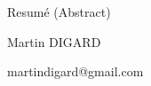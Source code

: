 
	
	\Large
	\begin{center}
		Resumé (Abstract)\\ 
		
		\hspace{10pt}
		
		\large
		Martin DIGARD\\
		
		\hspace{10pt}
		
		\small
		martindigard@gmail.com\\
		
	\end{center}
	
	\hspace{10pt}
	
	\normalsize
	
